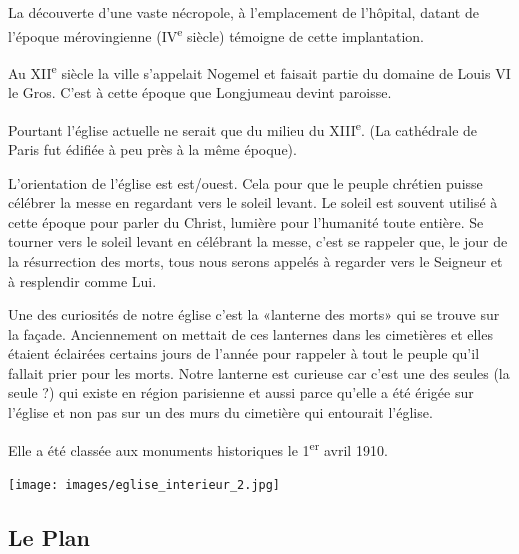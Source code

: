 \documentclass[a5paper, 9pt]{extarticle}
\begin{document}
La découverte d'une vaste nécropole, à l'emplacement de l'hôpital,
datant de l'époque mérovingienne (\textsc{IV}\textsuperscript{e}
siècle) témoigne de cette implantation.

Au \textsc{XII}\textsuperscript{e} siècle la ville s'appelait Nogemel
et faisait partie du domaine de Louis \textsc{VI} le Gros. C'est à
cette époque que Longjumeau devint paroisse.

Pourtant l'église actuelle ne serait que du milieu du
\textsc{XIII}\textsuperscript{e}. (La cathédrale de Paris fut édifiée
à peu près à la même époque).

L'orientation de l'église est est/ouest. Cela pour que le peuple
chrétien puisse célébrer la messe en regardant vers le soleil levant.
Le soleil est souvent utilisé à cette époque pour parler du Christ,
lumière pour l'humanité toute entière. Se tourner vers le soleil
levant en célébrant la messe, c'est se rappeler que, le jour de la
résurrection des morts, tous nous serons appelés à regarder vers le
Seigneur et à resplendir comme Lui.

Une des curiosités de notre église c'est la «lanterne des morts» qui
se trouve sur la façade. Anciennement on mettait de ces lanternes dans
les cimetières et elles étaient éclairées certains jours de l'année
pour rappeler à tout le peuple qu'il fallait prier pour les morts.
Notre lanterne est curieuse car c'est une des seules (la seule ?) qui
existe en région parisienne et aussi parce qu'elle a été érigée sur
l'église et non pas sur un des murs du cimetière qui entourait
l'église.

Elle a été classée aux monuments historiques le 1\textsuperscript{er}
avril 1910.

\begin{center}
  \texttt{[image: images/eglise\_interieur\_2.jpg]}
\end{center}


\newpage

\subsection*{Le Plan}
\end{document}
